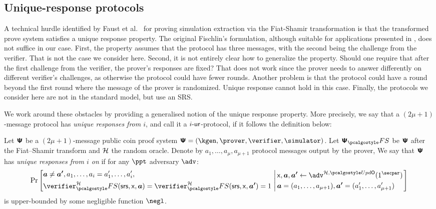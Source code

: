 \subsection{Unique-response protocols}
A technical hurdle identified by Faust et al.~\cite{INDOCRYPT:FKMV12} for
proving simulation extraction via the Fiat-Shamir transformation is that the
transformed prove system satisfies a unique response property. The original
Fischlin's formulation, although suitable for applications presented in
\cite{C:Fischlin05,INDOCRYPT:FKMV12}, does not suffice in our case. First, the
property assumes that the protocol has three messages, with the second being the
challenge from the verifier. That is not the case we consider here. Second, it
is not entirely clear how to generalize the property. Should one require that
after the first challenge from the verifier, the prover's responses are fixed?
That does not work since the prover needs to answer differently on different
verifier's challenges, as otherwise the protocol could have fewer rounds.
Another problem is that the protocol could have a round beyond the
first round where the message of the prover is randomized. Unique response cannot hold in
this case. Finally, the protocols we consider here are not in the standard
model, but use an SRS.

We work around these obstacles by providing a generalised notion of the unique
response property. More precisely, we say that a $(2\mu + 1)$-message protocol
has \emph{unique responses from $i$}, and call it a ${i\text{-}\mathsf{ur}}$-protocol, if it
follows the definition below:


\begin{definition}
	\label{def:wiuru}
	Let $\bm{\mathsf{\Psi}}$ be a $(2\mu + 1)$-message public coin proof system
	$\ps = (\kgen, \prover, \verifier, \simulator)$. Let $\proofsystem_\fs$ be
	$\bm{\mathsf{\Psi}}$ after the Fiat--Shamir transform and $\mathcal{H}$ the random
	oracle. Denote by $a_1, \ldots, a_{\mu}, a_{\mu + 1}$ protocol messages output
	by the prover, We say that $\bm{\mathsf{\Psi}}$ has \emph{unique responses from $i$
		on} if for any $\ppt$ adversary $\adv$:
	\[
	\Pr\left[
	\begin{aligned}
	& \vec{a} \neq \vec{a'}, a_1, \ldots, a_{i} = a'_1,
	\ldots, a'_{i}, \\
	& \verifier^\ro_\fs (\srs, \inp, \vec{a}) =
	\verifier^\ro_\fs(\srs, \inp, \vec{a'}) = 1  \\
	\end{aligned}
	\,\left|\,
	\begin{aligned}
	& \inp, \vec{a},  \vec{a'}  \gets \adv^{\ro, \initU}(1^\secpar) \\
& \vec{a} = (a_1, \ldots, a_{\mu + 1}), \vec{a'} = (a'_1, \ldots,
	a'_{\mu + 1})
	\end{aligned}
	\right.\right]
	\]
	is upper-bounded by some negligible function $\negl$.
\end{definition}

